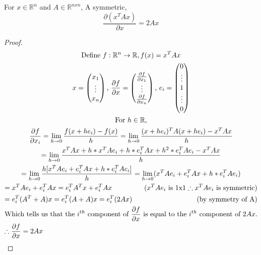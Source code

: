 \begin{lemma} \label{lemma1}
	For \(x \in \mathbb{R} ^n \) and \(A \in \mathbb{R}^{nxn}\), A symmetric,
	\[\frac{\partial (x^T A x)}{\partial x} = 2 A x\]
\end{lemma}
\begin{proof}
	\begin{multline*}
	\text{Define } f: \mathbb{R}^n \to \mathbb{R}, f(x) = x^T A x \\
	x = \begin{pmatrix}
	x_1 \\
	\vdots \\
	x_n
	\end{pmatrix} \text{, }
	\frac{\partial{f}}{\partial{x}} = 
	\begin{pmatrix}
	\frac{\partial{f}}{\partial{x_1}} \\
	\vdots \\
	\frac{\partial{f}}{\partial{x_n}}
	\end{pmatrix} \text{, } e_i = 
	\begin{pmatrix}
	0 \\
	\vdots \\
	1 \\
	\vdots \\
	0
	\end{pmatrix} \\
	\text{For } h \in \mathbb{R} \text{,} \\
	\frac{\partial f}{\partial x_i} = \lim_{h \rightarrow 0} \frac{f(x+h e_i) - f(x)}{h} = \lim_{h \rightarrow 0} \frac{(x + h e_i)^T A (x + h e_i) - x^T A x}{h} \\
	= \lim_{h \rightarrow 0} \frac{ x^T A x + h * x^T A e_i + h * e_i^T A x + h^2 * e_i^T A e_i - x^T A x}{h} \\
	= \lim_{h \rightarrow 0} \frac{ h [x^T A e_i + e_i^T A x + h * e_i^T A e_i]}{h} = \lim_{h \rightarrow 0} ( x^T A e_i + e_i^T A x + h * e_i^T A e_i) \\
	= x^T A e_i + e_i^T A x = e_i^T A^T x + e_i^T A x \hfill \text{(\(x^T A e_i\) is 1x1 \(\therefore x^T A e_i\) is symmetric)} \\
	= e_i^T ( A^T + A) x  = e_i^T ( A + A) x = e_i^T (2A x) \hfill \text{(by symmetry of A)} \\
	\text{Which tells us that the \(i^{th}\) component of \(\frac{\partial f}{\partial x} \) is equal to the \(i^{th}\) component of \(2Ax\).} \\
	\therefore \frac{\partial f}{\partial x} = 2Ax \hfill
	\end{multline*}
\end{proof}

